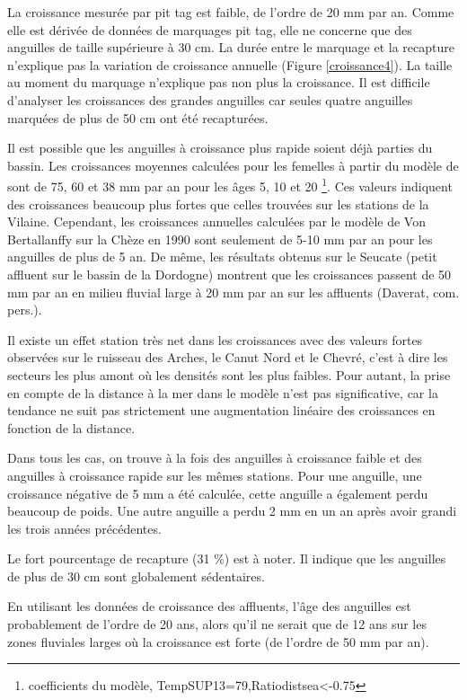 \documentclass[10pt,twocolumn,titlepage,twoside]{article}\usepackage[]{graphicx}\usepackage[]{xcolor}
\begin{document}
La croissance mesurée par pit tag est faible, de l'ordre de 20 mm par an. Comme
elle est dérivée de données de marquages pit tag, elle ne concerne que des
anguilles de taille supérieure à 30 cm.
La durée entre le marquage et la recapture n'explique pas la variation de
croissance annuelle (Figure \ref{croissance4}). La taille au moment du marquage
n'explique pas non plus la croissance. Il est difficile d'analyser les
croissances des grandes anguilles car seules quatre anguilles marquées de plus
de 50 cm ont été recapturées. 

Il est possible que les anguilles à croissance plus
rapide soient déjà parties du bassin. Les croissances moyennes calculées pour les femelles
à partir du modèle de \citet{daverat_one_2011} sont de 75, 60 et 38 mm par an pour les âges 5, 10 et 20 
\footnote{coefficients du modèle, TempSUP13=79,Ratiodistsea<-0.75}. 
Ces valeurs indiquent des croissances beaucoup plus fortes que celles trouvées sur les stations de 
la Vilaine. Cependant, les croissances annuelles calculées par le modèle de Von Bertallanffy sur
la Chèze en 1990 \citep{mounaix_intercalibration_1992} sont
seulement de 5-10 mm par an pour les anguilles de plus de 5 an. De même, les
résultats obtenus sur le Seucate (petit affluent sur le
bassin de la Dordogne) montrent que les croissances passent de 50 mm par an en
milieu fluvial large à 20 mm par an sur les
affluents (Daverat, com. pers.). 

Il existe un effet station très net dans les croissances avec des valeurs
fortes observées sur le ruisseau des Arches, le Canut Nord et le Chevré, c'est à
dire les secteurs les plus amont où les densités sont les plus faibles. Pour
autant, la prise en compte de la distance à la mer dans le modèle n'est pas
significative, car la tendance ne suit pas strictement une augmentation linéaire
des croissances en fonction de la distance.

Dans tous les cas,  on
trouve à la fois des anguilles à croissance faible et des anguilles à croissance
rapide sur les mêmes stations. Pour une anguille, une croissance négative de 5
mm a été calculée, cette anguille a également perdu beaucoup de poids. Une autre
anguille a perdu 2 mm en un an après avoir grandi les trois années précédentes.

Le fort pourcentage de recapture (31 \%) est à noter.
Il indique que les anguilles de plus de 30 cm sont globalement
sédentaires.

En utilisant les données de croissance des affluents, l'âge des anguilles est
probablement de l'ordre de 20 ans, alors qu'il ne serait que de 12 ans sur les
zones fluviales larges où la croissance est forte (de l'ordre de 50 mm par an). 
\end{document}
